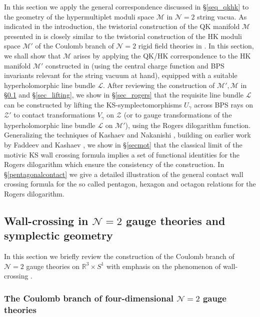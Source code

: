 \documentclass[12pt,reqno]{article}
\numberwithin{equation}{section}
\newcommand{\cM}{\mathcal{M}}
\newcommand{\cN}{\mathcal{N}}
\newcommand{\cZ}{\mathcal{Z}}
\newcommand{\IR}{\mathbb{R}}
\newcommand{\lb}{\mathscr{L}}
\newcommand{\stg}{{U}_\gamma}
\newcommand{\ctg}{{V}_\gamma}
\def\pcM{\cM'}
\def\pcZ{\cZ'}
\numberwithin{equation}{section}
\begin{document}
In this section we apply the general correspondence discussed in \S\ref{seq_qkhk}
to the geometry of the hypermultiplet moduli space $\cM$ in $\cN=2$ string vacua.
As indicated in the introduction, the twistorial construction of the QK
manifold $\cM$ presented in \cite{Alexandrov:2008gh}  is closely similar to the twistorial construction
of the HK moduli space $\pcM$ of the Coulomb branch of $\cN=2$ rigid field theories
 in \cite{Gaiotto:2008cd}. In this section, we shall show that  $\cM$
arises by applying the QK/HK
correspondence to the HK manifold $\pcM$ constructed in  \cite{Gaiotto:2008cd} (using
the central charge function and BPS invariants relevant for the string vacuum at hand),
equipped with a suitable hyperholomorphic line bundle $\lb$. After reviewing the
construction of $\pcM,\cM$ in \S \ref{GMNreview} and  \S\ref{sec_lifting},
we show in \S\ref{sec_rogers}
that the requisite line bundle $\lb$ can be constructed by lifting the
KS-symplectomorphisms $\stg$ across BPS rays on $\pcZ$ to
contact transformations $\ctg$ on $\cZ$ (or to gauge transformations
of the hyperholomorphic line bundle $\lb$ on $\pcM$), using the Rogers dilogarithm function.
Generalizing the techniques of Kashaev and Nakanishi
\cite{Kashaev:2011}, building on earlier work by Faddeev and Kashaev \cite{Faddeev:1993rs},
we show in \S \ref{secmot} that the classical limit of
the motivic KS wall crossing formula implies a set of functional identities
for the Rogers dilogarithm which ensure the consistency of the construction.
In \S \ref{pentagonalcontact}
we give a detailed illustration of the general contact wall crossing formula for the
so called pentagon, hexagon and octagon relations for the Rogers dilogarithm.


\subsection{Wall-crossing in $\cN=2$ gauge theories and symplectic geometry}
\label{GMNreview}

In this section we briefly review the construction of the Coulomb branch of
$\cN=2$ gauge theories on $\IR^3\times S^1$ with emphasis on the phenomenon of wall-crossing \cite{Gaiotto:2008cd}.

\subsubsection{The Coulomb branch of four-dimensional $\cN=2$ gauge theories}
\end{document}
